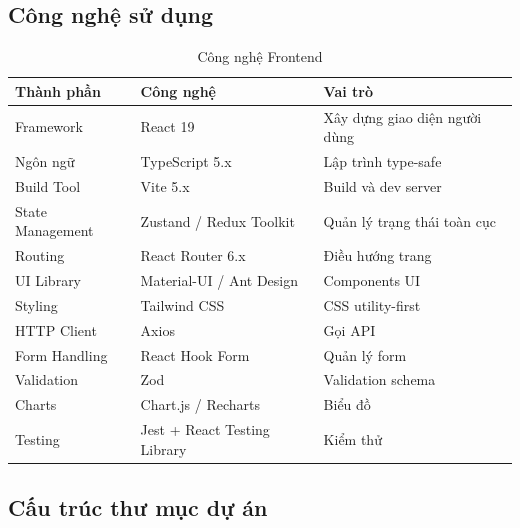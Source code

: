 \documentclass[12pt,a4paper]{report}
\begin{document}
\subsection{Công nghệ sử dụng}

\begin{table}[H]
\centering
\caption{Công nghệ Frontend}
\begin{tabular}{|p{4cm}|p{5cm}|p{6cm}|}
\hline
\textbf{Thành phần} & \textbf{Công nghệ} & \textbf{Vai trò} \\
\hline
Framework & React 19 & Xây dựng giao diện người dùng \\
\hline
Ngôn ngữ & TypeScript 5.x & Lập trình type-safe \\
\hline
Build Tool & Vite 5.x & Build và dev server \\
\hline
State Management & Zustand / Redux Toolkit & Quản lý trạng thái toàn cục \\
\hline
Routing & React Router 6.x & Điều hướng trang \\
\hline
UI Library & Material-UI / Ant Design & Components UI \\
\hline
Styling & Tailwind CSS & CSS utility-first \\
\hline
HTTP Client & Axios & Gọi API \\
\hline
Form Handling & React Hook Form & Quản lý form \\
\hline
Validation & Zod & Validation schema \\
\hline
Charts & Chart.js / Recharts & Biểu đồ \\
\hline
Testing & Jest + React Testing Library & Kiểm thử \\
\hline
\end{tabular}
\label{tab:frontend_technologies}
\end{table}

\subsection{Cấu trúc thư mục dự án}
\end{document}
